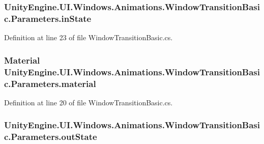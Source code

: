 \subsubsection[{in\+State}]{ Unity\+Engine.\+U\+I.\+Windows.\+Animations.\+Window\+Transition\+Basic.\+Parameters.\+in\+State}\label{class_unity_engine_1_1_u_i_1_1_windows_1_1_animations_1_1_window_transition_basic_1_1_parameters_a99afa939d62caf24d92b664b6eff4d5d}


Definition at line 23 of file Window\+Transition\+Basic.\+cs.

\hypertarget{class_unity_engine_1_1_u_i_1_1_windows_1_1_animations_1_1_window_transition_basic_1_1_parameters_a089d55e5202e5a3b9eb792f7c5bdc238}{}
\subsubsection[{material}]{\setlength{\rightskip}{0pt plus 5cm}Material Unity\+Engine.\+U\+I.\+Windows.\+Animations.\+Window\+Transition\+Basic.\+Parameters.\+material}\label{class_unity_engine_1_1_u_i_1_1_windows_1_1_animations_1_1_window_transition_basic_1_1_parameters_a089d55e5202e5a3b9eb792f7c5bdc238}


Definition at line 20 of file Window\+Transition\+Basic.\+cs.

\hypertarget{class_unity_engine_1_1_u_i_1_1_windows_1_1_animations_1_1_window_transition_basic_1_1_parameters_a437b3a881c68c3ae997fdf4e1c906ba7}{}
\subsubsection[{out\+State}]{ Unity\+Engine.\+U\+I.\+Windows.\+Animations.\+Window\+Transition\+Basic.\+Parameters.\+out\+State}\label{class_unity_engine_1_1_u_i_1_1_windows_1_1_animations_1_1_window_transition_basic_1_1_parameters_a437b3a881c68c3ae997fdf4e1c906ba7}


